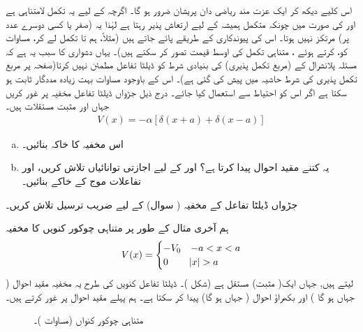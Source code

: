   اس کلیے دیکھ کر ایک عزت مند ریاضی دان پریشان ضرور ہو گا۔ اگرچہ  کے لیے یہ تکمل لامتناہی ہے اور  کی صورت میں چونکہ متکمل ہمیشہ کے لیے ارتعاش پذیر رہتا ہے لہٰذا یہ (صفر یا کسی دوسرے عدد پر)  مرتکز نہیں ہوتا۔ اس کی پیوندکاری کے طریقے پائے جاتے ہیں (مثلاً، ہم  تا  تکمل لے کر، مساوات  کو،  کرتے ہوئے ، متناہی تکمل کی اوسط قیمت تصور کر سکتے ہیں)۔ یہاں دشواری کا سبب یہ ہے کہ مسئلہ پلانشرال کے (مربع تکمل پذیری) کی بنیادی شرط کو ڈیلٹا تفاعل مطمئن نہیں کرتا(صفحہ  پر مربع تکمل پذیری کی شرط حاشیہ میں پیش کی گئی ہے)۔ اس کے باوجود مساوات   بہت زیادہ  مددگار ثابت ہو سکتا ہے اگر اس کو احتیاط سے استعمال کیا جائے۔
درج ذیل جڑواں ڈیلٹا تفاعل مخفیہ پر غور کریں جہاں اور   مثبت مستقلات ہیں۔
\begin{align*}
V(x)=-\alpha[\delta(x+a)+\delta(x-a)]
\end{align*}
\begin{enumerate}[a.]
\item
 اس مخفیہ کا خاکہ بنائیں۔
\item
 یہ کتنے  مقید احوال پیدا کرتا ہے؟  اور کے لیے  اجازتی توانائیاں تلاش کریں،  اور تفاعلات موج کے  خاکے بنائیں۔
\end{enumerate}
جڑواں ڈیلٹا تفاعل کے مخفیہ ( سوال) کے لیے ضریب ترسیل تلاش کریں۔ 

 ہم آخری مثال کے طور پر متناہی چوکور کنویں کا مخفیہ
\begin{align}\label{مساوات_شروڈنگر_متناہی_چکور_کنواں_مخفیہ}
V(x)=
 \begin{cases} 
 -V_{0} & -a< x< a \\
 0 & \abs{x}> a
 \end{cases}
\end{align}
لیتے ہیں, جہاں ایک( مثبت) مستقل ہے (شکل )۔ ڈیلٹا تفاعل کنویں کی طرح یہ مخفیہ مقید احوال ( جہاں ہو گا )  اور  بکھراؤ احوال ( جہاں ہو گا)   پیدا کر سکتا ہے۔ ہم پہلے مقید احوال پر غور کرتے ہیں۔
 
\begin{figure}
\centering
{}
\caption{متناہی چوکور کنواں (مساوات )۔}
\label{شکل_غیر_تابع_متناہی_کنواں}
\end{figure}
 
